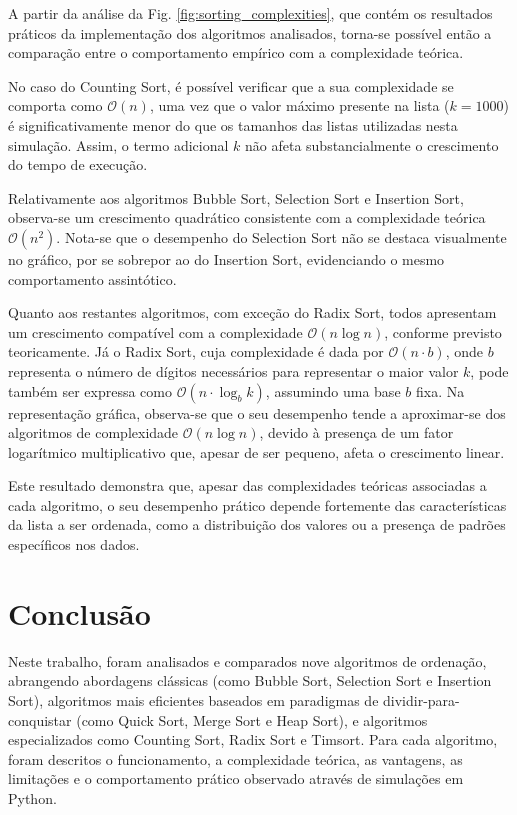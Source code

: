 \documentclass[conference]{IEEEtran}
\begin{document}
A partir da análise da Fig. \ref{fig:sorting_complexities}, que contém os resultados práticos da implementação dos algoritmos analisados, torna-se possível então a comparação entre o comportamento empírico com a complexidade teórica.

No caso do Counting Sort, é possível verificar que a sua complexidade se comporta como \( \mathcal{O}(n) \), uma vez que o valor máximo presente na lista (\( k = 1000 \)) é significativamente menor do que os tamanhos das listas utilizadas nesta simulação. Assim, o termo adicional \( k \) não afeta substancialmente o crescimento do tempo de execução.

Relativamente aos algoritmos Bubble Sort, Selection Sort e Insertion Sort, observa-se um crescimento quadrático consistente com a complexidade teórica \( \mathcal{O}(n^2) \). Nota-se que o desempenho do Selection Sort não se destaca visualmente no gráfico, por se sobrepor ao do Insertion Sort, evidenciando o mesmo comportamento assintótico.

Quanto aos restantes algoritmos, com exceção do Radix Sort, todos apresentam um crescimento compatível com a complexidade \( \mathcal{O}(n \log n) \), conforme previsto teoricamente. Já o Radix Sort, cuja complexidade é dada por \( \mathcal{O}(n \cdot b) \), onde \( b \) representa o número de dígitos necessários para representar o maior valor \( k \), pode também ser expressa como \( \mathcal{O}(n \cdot \log_b k) \), assumindo uma base \( b \) fixa. Na representação gráfica, observa-se que o seu desempenho tende a aproximar-se dos algoritmos de complexidade \( \mathcal{O}(n \log n) \), devido à presença de um fator logarítmico multiplicativo que, apesar de ser pequeno, afeta o crescimento linear.

Este resultado demonstra que, apesar das complexidades teóricas associadas a cada algoritmo, o seu desempenho prático depende fortemente das características da lista a ser ordenada, como a distribuição dos valores ou a presença de padrões específicos nos dados.

\section{Conclusão}

Neste trabalho, foram analisados e comparados nove algoritmos de ordenação, abrangendo abordagens clássicas (como Bubble Sort, Selection Sort e Insertion Sort), algoritmos mais eficientes baseados em paradigmas de dividir-para-conquistar (como Quick Sort, Merge Sort e Heap Sort), e algoritmos especializados como Counting Sort, Radix Sort e Timsort. Para cada algoritmo, foram descritos o funcionamento, a complexidade teórica, as vantagens, as limitações e o comportamento prático observado através de simulações em Python.
\end{document}
